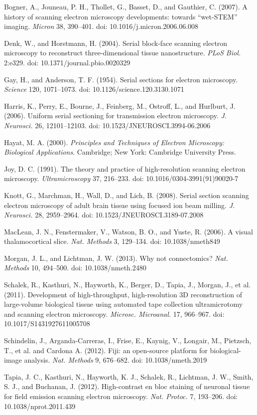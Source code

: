 \documentclass{article}
\begin{document}
\begin{hangpars}\small
Bogner, A., Jouneau, P. H., Thollet, G., Basset, D., and Gauthier, C. (2007). A history of scanning electron microscopy developments: towards “wet-STEM” imaging. \emph{Micron} 38, 390–401. doi: 10.1016/j.micron.2006.06.008

Denk, W., and Horstmann, H. (2004). Serial block-face scanning electron microscopy to reconstruct three-dimensional tissue nanostructure. \emph{PLoS Biol.} 2:e329. doi: 10.1371/journal.pbio.0020329

Gay, H., and Anderson, T. F. (1954). Serial sections for electron microscopy. \emph{Science} 120, 1071–1073. doi: 10.1126/science.120.3130.1071

Harris, K., Perry, E., Bourne, J., Feinberg, M., Ostroff, L., and Hurlburt, J. (2006). Uniform serial sectioning for transmission electron microscopy. \emph{J. Neurosci.} 26, 12101–12103. doi: 10.1523/JNEUROSCI.3994-06.2006

Hayat, M. A. (2000). \emph{Principles and Techniques of Electron Microscopy: Biological Applications}. Cambridge; New York: Cambridge University Press.

Joy, D. C. (1991). The theory and practice of high-resolution scanning electron microscopy. \emph{Ultramicroscopy} 37, 216–233. doi: 10.1016/0304-3991(91)90020-7

Knott, G., Marchman, H., Wall, D., and Lich, B. (2008). Serial section scanning electron microscopy of adult brain tissue using focused ion beam milling. \emph{J. Neurosci.} 28, 2959–2964. doi: 10.1523/JNEUROSCI.3189-07.2008

MacLean, J. N., Fenstermaker, V., Watson, B. O., and Yuste, R. (2006). A visual thalamocortical slice. \emph{Nat. Methods} 3, 129–134. doi: 10.1038/nmeth849

Morgan, J. L., and Lichtman, J. W. (2013). Why not connectomics? \emph{Nat. Methods} 10, 494–500. doi: 10.1038/nmeth.2480

Schalek, R., Kasthuri, N., Hayworth, K., Berger, D., Tapia, J., Morgan, J., et al. (2011). Development of high-throughput, high-resolution 3D reconstruction of large-volume biological tissue using automated tape collection ultramicrotomy and scanning electron microscopy. \emph{Microsc. Microanal.} 17, 966–967. doi: 10.1017/S1431927611005708

Schindelin, J., Arganda-Carreras, I., Frise, E., Kaynig, V., Longair, M., Pietzsch, T., et al. and Cardona A. (2012). Fiji: an open-source platform for biological-image analysis. \emph{Nat. Methods} 9, 676–682. doi: 10.1038/nmeth.2019

Tapia, J. C., Kasthuri, N., Hayworth, K. J., Schalek, R., Lichtman, J. W., Smith, S. J., and Buchanan, J. (2012). High-contrast en bloc staining of neuronal tissue for field emission scanning electron microscopy. \emph{Nat. Protoc.} 7, 193–206. doi: 10.1038/nprot.2011.439
\end{hangpars}
\end{document}
